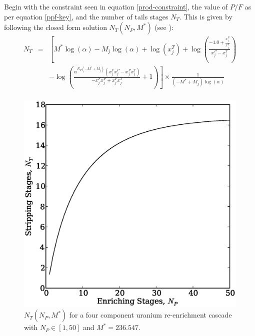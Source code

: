 \documentclass{ansconf}
\begin{document}
Begin with the constraint seen in equation \ref{prod-constraint}, the
value of $P/F$ as per equation \ref{ppf-key}, and the number
of tails stages $N_T$.   This is given by following the closed form solution 
$N_T(N_P, M^*)$ (see \cite{Scopatz2012}):
\begin{equation}
\begin{array}{lcl}
N_T & = & \left[M^{*} \log{\left (\alpha \right )} - M_{j} \log{\left (\alpha \right )} + \log{\left (x^{T}_{j} \right )} + \log{\left (\frac{-1.0 + \frac{x^{P}_{j}}{x^{F}_{j}}}{x^{P}_{j} - x^{T}_{j}} \right )}  \right. \\
& & \left. - \log{\left (\frac{\alpha^{N_{P} \left(- M^{*} + M_{j}\right)} \left(x^{F}_{j} x^{P}_{j} - x^{P}_{j} x^{T}_{j}\right)}{- x^{F}_{j} x^{P}_{j} + x^{F}_{j} x^{T}_{j}} + 1 \right )}\right] \times \frac{1}{\left(- M^{*} + M_{j}\right) \log{\left (\alpha \right )}} \\
\end{array}
\label{nt_closed}
\end{equation}

\begin{figure}[htpb]
\begin{center}
\includegraphics[scale=0.5]{nt_closed.eps}
\caption{$N_T(N_P, M^*)$ for a four component uranium re-enrichment cascade with 
         $N_P\in[1,50]$ and $M^*=236.547$.}
\label{nt_closed_fig}
\end{center}
\end{figure}
\end{document}
